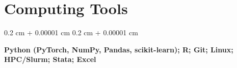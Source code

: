 \documentclass[10pt, letterpaper]{article}
\newenvironment{highlights}{
    \begin{itemize}[
        topsep=0.10 cm,
        parsep=0.10 cm,
        partopsep=0pt,
        itemsep=0pt,
        leftmargin=0.4 cm + 10pt
    ]
}{
    \end{itemize}
} %
\newenvironment{highlightsforbulletentries}{
    \begin{itemize}[
        topsep=0.10 cm,
        parsep=0.10 cm,
        partopsep=0pt,
        itemsep=0pt,
        leftmargin=10pt
    ]
}{
    \end{itemize}
} %
\newenvironment{onecolentry}{
    \begin{adjustwidth}{
        0.2 cm + 0.00001 cm
    }{
        0.2 cm + 0.00001 cm
    }
}{
    \end{adjustwidth}
} %
\newenvironment{twocolentry}[2][]{
    \onecolentry
    \def\secondColumn{#2}
    \setcolumnwidth{\fill, 4.5 cm}
    \begin{paracol}{2}
}{
    \switchcolumn \raggedleft \secondColumn
    \end{paracol}
    \endonecolentry
} %
\begin{document}

\vspace{-0.0cm}

\section{Computing Tools}
    \begin{onecolentry}
        \textbf{Python (PyTorch, NumPy, Pandas, scikit-learn); R; Git; Linux; HPC/Slurm; Stata; Excel}
    \end{onecolentry}
\end{document}
